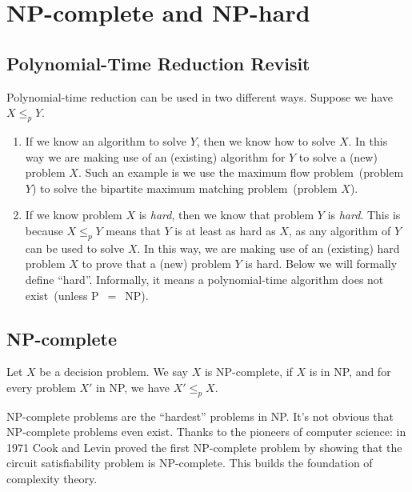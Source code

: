 \setcounter{definition}{0} \setcounter{property}{0} \setcounter{claim}{0} \setcounter{fact}{0} \setcounter{corollary}{0} \setcounter{figure}{0}
\section{NP-complete and NP-hard}

\subsection*{Polynomial-Time Reduction Revisit}

Polynomial-time reduction can be used in two different ways. Suppose we have $X\le_p Y$.
\vspace*{-\topsep}
\begin{enumerate}
\item If we know an algorithm to solve $Y$, then we know how to solve $X$. In this way
we are making use of an (existing) algorithm for $Y$ to solve a (new) problem $X$. Such an example
is we use the maximum flow problem~(problem $Y$) to solve the bipartite maximum matching problem~(problem $X$).
\item If we know problem $X$ is \emph{hard}, then we know that problem $Y$ is \emph{hard}. 
This is because $X\le_p Y$ means that $Y$ is at least as hard as $X$, as any algorithm of $Y$ can be used to solve $X$.
In this way, we are making use of an (existing) hard problem $X$
to prove that a (new) problem $Y$ is hard.  Below we will formally define ``hard''.
Informally, it means a polynomial-time algorithm does not exist~(unless P{}~$=${}~NP).
\end{enumerate}


\subsection*{NP-complete}

\begin{definition}[NP-complete]
Let $X$ be a decision problem. We say $X$ is NP-complete, if $X$ is in NP, and for every problem $X'$ in NP, we have $X'\le_p X$.
\end{definition}

NP-complete problems are the ``hardest'' problems in NP. It's not obvious that
NP-complete problems even exist.  
Thanks to the pioneers of computer science: in 1971 Cook and Levin proved the first
NP-complete problem by showing that the circuit satisfiability problem is NP-complete.
This builds the foundation of complexity theory.

